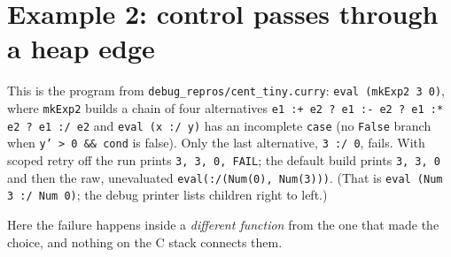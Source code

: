 \documentclass[11pt]{article}
\newcommand{\code}[1]{\texttt{#1}}
\begin{document}
\section{Example 2: control passes through a heap edge}\label{sec:ex2}

This is the program from \code{debug\_repros/cent\_tiny.curry}: \code{eval
(mkExp2 3 0)}, where \code{mkExp2} builds a chain of four alternatives
\code{e1 :+ e2 ? e1 :- e2 ? e1 :* e2 ? e1 :/ e2} and \code{eval (x :/ y)} has
an incomplete \code{case} (no \code{False} branch when \code{y' > 0 \&\&
cond} is false). Only the last alternative, \code{3 :/ 0}, fails. With
scoped retry off the run prints \code{3, 3, 0, FAIL}; the default build
prints \code{3, 3, 0} and then the raw, unevaluated
\code{eval(:/(Num(0), Num(3)))}. (That is \code{eval (Num 3 :/ Num 0)}; the
debug printer lists children right to left.)

Here the failure happens inside a \emph{different function} from the one that
made the choice, and nothing on the C stack connects them.
\end{document}
